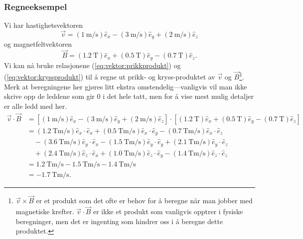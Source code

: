 \documentclass[a4paper,norsk,12pt]{book}
\def\ex{\ensuremath{\hat{e}_x}}
\def\ey{\ensuremath{\hat{e}_y}}
\def\ez{\ensuremath{\hat{e}_z}}
\begin{document}
\subsubsection{Regneeksempel}
Vi har hastighetsvektoren
\begin{displaymath}
	\vec{v} = (1~\mathrm{m/s})\ex - (3~\mathrm{m/s})\ey + (2~\mathrm{m/s})\ez
\end{displaymath}
og magnetfeltvektoren 
\begin{displaymath}
	\vec{B} = (1.2~\mathrm{T})\ex + (0.5~\mathrm{T})\ey - (0.7~\mathrm{T})\ez.
\end{displaymath}
Vi kan nå bruke relasjonene (\ref{eq:vektor:prikkprodukt}) og (\ref{eq:vektor:kryssprodukt}) til å regne ut prikk- og kryss-produktet av $\vec{v}$ og $\vec{B}$\footnote{$\vec{v}\times\vec{B}$ er et produkt som det ofte er behov for å beregne når man jobber med magnetiske krefter. $\vec{v}\cdot\vec{B}$ er ikke et produkt som vanligvis opptrer i fysiske beregninger, men det er ingenting som hindrer oss i å beregne dette produktet.}. Merk at beregningene her gjøres litt ekstra omstendelig---vanligvis vil man ikke skrive opp de leddene som gir 0 i det hele tatt, men for å vise mest mulig detaljer er alle ledd med her.
\begin{displaymath}
\begin{aligned}
	\vec{v}\cdot\vec{B} &= \left[ (1~\mathrm{m/s})\ex - (3~\mathrm{m/s})\ey + (2~\mathrm{m/s})\ez \right] \cdot
	\left[(1.2~\mathrm{T})\ex + (0.5~\mathrm{T})\ey - (0.7~\mathrm{T})\ez\right] \\
	&= (1.2~\mathrm{Tm/s})\ex\cdot\ex + (0.5~\mathrm{Tm/s})\ex\cdot\ey -  (0.7~\mathrm{Tm/s})\ex\cdot\ez \\
	&\quad- (3.6~\mathrm{Tm/s})\ey\cdot\ex- (1.5~\mathrm{Tm/s})\ey\cdot\ey+ (2.1~\mathrm{Tm/s})\ey\cdot\ez \\
	&\quad+ (2.4~\mathrm{Tm/s})\ez\cdot\ex+ (1.0~\mathrm{Tm/s})\ez\cdot\ey -  (1.4~\mathrm{Tm/s})\ez\cdot\ez \\
	&= 1.2~\mathrm{Tm/s} - 1.5~\mathrm{Tm/s} - 1.4~\mathrm{Tm/s} \\
	&= -1.7~\mathrm{Tm/s}.
\end{aligned}
\end{displaymath}
\end{document}
